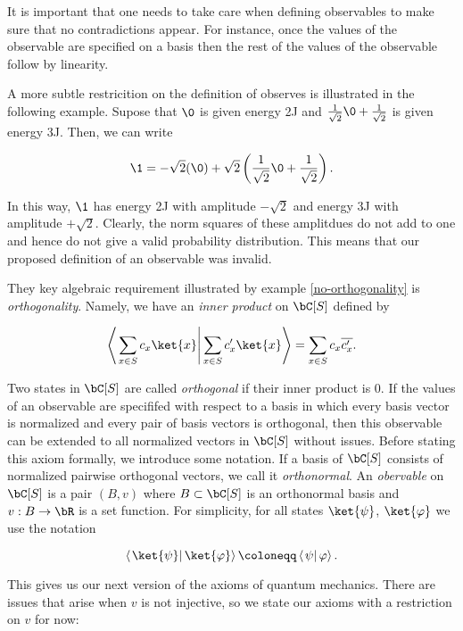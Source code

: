 It is important that one needs to take care when defining observables to make sure that no contradictions appear. For instance, once the values of the observable are specified on a basis then the rest of the values of the observable follow by linearity.

\begin{ex}\label{no-orthogonality}
A more subtle restricition on the definition of observes is illustrated in the following example. Supose that $\0$ is given energy 2J and $\frac{1}{\sqrt{2}}\0+\frac{1}{\sqrt{2}}$ is given energy 3J. Then, we can write

$$\1=-\sqrt{2}(\0)+\sqrt{2}\left(\frac{1}{\sqrt{2}}\0+\frac{1}{\sqrt{2}}\right).$$

In this way, $\1$ has energy 2J with amplitude $-\sqrt{2}$ and energy 3J with amplitude $+\sqrt{2}$. Clearly, the norm squares of these amplitdues do not add to one and hence do not give a valid probability distribution. This means that our proposed definition of an observable was invalid.
\end{ex}

They key algebraic requirement illustrated by example \ref{no-orthogonality} is {\em orthogonality}. Namely, we have an {\em inner product} on $\bC[S]$ defined by

$$\left<\left.\sum_{x\in S}c_x\ket{x}\right| \sum_{x\in S}c'_x \ket{x}\right>=\sum_{x\in S}c_x\overline{c_x'}.$$

Two states in $\bC[S]$ are called {\em orthogonal} if their inner product is $0$. If the values of an observable are specififed with respect to a basis in which every basis vector is normalized and every pair of basis vectors is orthogonal, then this observable can be extended to all normalized vectors in $\bC[S]$ without issues. Before stating this axiom formally, we introduce some notation. If a basis of $\bC[S]$ consists of normalized pairwise orthogonal vectors, we call it {\em orthonormal}. An {\em obervable} on $\bC[S]$ is a pair $(B,v)$ where $B\subset \bC[S]$ is an orthonormal basis and $v:B\to \bR$ is a set function. For simplicity, for all states $\ket{\psi}$, $\ket{\varphi}$ we use the notation

$$\left< \left. \ket{\psi} \right| \ket{\varphi}\right>\coloneqq \left< \left. \psi \right| \varphi \right>.$$

This gives us our next version of the axioms of quantum mechanics. There are issues that arise when $v$ is not injective, so we state our axioms with a restriction on $v$ for now:

